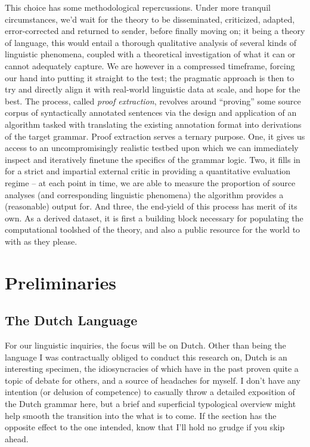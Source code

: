 This choice has some methodological repercussions.
Under more tranquil circumstances, we'd wait for the theory to be disseminated, criticized, adapted, error-corrected and returned to sender, before finally moving on; it being a theory of language, this would entail a thorough qualitative analysis of several kinds of linguistic phenomena, coupled with a theoretical investigation of what it can or cannot adequately capture.
We are however in a compressed timeframe, forcing our hand into putting it straight to the test; the pragmatic approach is then to try and directly align it with real-world linguistic data at scale, and hope for the best.
The process, called \textit{proof extraction}, revolves around ``proving''  some source corpus of syntactically annotated sentences via the design and application of an algorithm tasked with translating the existing annotation format into derivations of the target grammar.
Proof extraction serves a ternary purpose.
One, it gives us access to an uncompromisingly realistic testbed upon which we can immediately inspect and iteratively finetune the specifics of the grammar logic.
Two, it fills in for a strict and impartial external critic in providing a quantitative evaluation regime -- at each point in time, we are able to measure the proportion of source analyses (and corresponding linguistic phenomena) the algorithm provides a (reasonable) output for.
And three, the end-yield of this process has merit of its own.
As a derived dataset, it is first a building block necessary for populating the computational toolshed of the theory, and also a public resource for the world to with as they please.

\section{Preliminaries}

\subsection{The Dutch Language}
For our linguistic inquiries, the focus will be on Dutch.
Other than being the language I was contractually obliged to conduct this research on, Dutch is an interesting specimen, the idiosyncracies of which have in the past proven quite a topic of debate for others, and a source of headaches for myself.
I don't have any intention (or delusion of competence) to casually throw a detailed exposition of the Dutch grammar here, but a brief and superficial typological overview might help smooth the transition into the what is to come.
If the section has the opposite effect to the one intended, know that I'll hold no grudge if you skip ahead.

